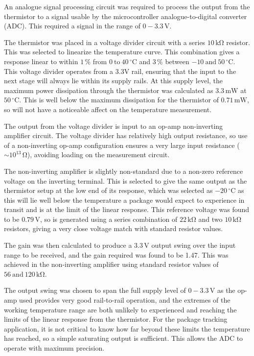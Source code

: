 \documentclass[a4paper,10pt]{article}  %
\providecommand{\degrees}{\ensuremath{^{\circ}}}
\begin{document}
An analogue signal processing circuit was required to process the
output from the thermistor to a signal usable by the microcontroller
analogue-to-digital converter (ADC). This required a signal in the
range of $0-3.3\,\mathrm{V}$.

The thermistor was placed in a voltage divider circuit with a series
$10\,\mathrm{k\Omega}$ resistor. This was selected to linearize the
temperature curve. This combination gives a response linear to within
$1\,\mathrm{\%}$ from $0\ \mathrm{to}\ 40\,\mathrm{\degrees C}$ and
$3\,\mathrm{\%}$ between $-10\ \mathrm{and}\ 50\,\mathrm{\degrees
  C}$. This voltage divider operates from a 3.3V rail, ensuring that
the input to the next stage will always lie within its supply
rails. At this supply level, the maximum power dissipation through the
thermistor was calculated as $3.3\,\mathrm{mW}$ at
$50\,\mathrm{\degrees C}$. This is well below the maximum dissipation
for the thermistor of $0.71\,\mathrm{mW}$, so will not have a
noticeable affect on the temperature measurement.

The output from the voltage divider is input to an op-amp
non-inverting amplifier circuit. The voltage divider has relatively
high output resistance, so use of a non-inverting op-amp configuration
ensures a very large input resistance ($\sim 10^{13}\,
\mathrm{\Omega}$), avoiding loading on the measurement circuit.

The non-inverting amplifier is slightly non-standard due to a non-zero
reference voltage on the inverting terminal. This is selected to give
the same output as the thermistor setup at the low end of its
response, which was selected as $-20\,\mathrm{\degrees C}$ as this
will lie well below the temperature a package would expect to
experience in transit and is at the limit of the linear response. This
reference voltage was found to be $0.79\,\mathrm{V}$, so is generated
using a series combination of $22\,\mathrm{k \Omega}$ and two
$10\,\mathrm{k \Omega}$ resistors, giving a very close voltage match
with standard resistor values.

The gain was then calculated to produce a $3.3\,\mathrm{V}$ output
swing over the input range to be received, and the gain required was
found to be 1.47. This was achieved in the non-inverting amplifier
using standard resistor values of $56\ \mathrm{and}\ 120\,\mathrm{k
  \Omega}$.

The output swing was chosen to span the full supply level of
$0-3.3\,\mathrm{V}$ as the op-amp used provides very good rail-to-rail
operation, and the extremes of the working temperature range are both
unlikely to experienced and reaching the limits of the linear response
from the thermistor. For the package tracking application, it is not
critical to know how far beyond these limits the temperature has
reached, so a simple saturating output is sufficient. This allows the
ADC to operate with maximum precision.
\end{document}
